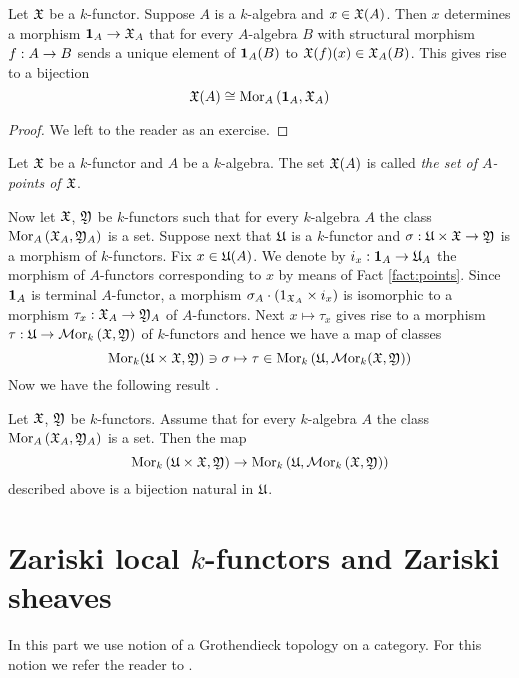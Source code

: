 \begin{fact}\label{fact:points}
Let ${\mathfrak X}$ be a $k$-functor. Suppose $A$ is a $k$-algebra and $x\in {\mathfrak X}(A)$. Then $x$ determines a morphism $\mathbf{1}_{A}\rightarrow {\mathfrak X}_A$ that for every $A$-algebra $B$ with structural morphism $f:A\rightarrow B$ sends a unique element of $\mathbf{1}_{A}(B)$ to ${\mathfrak X}(f)(x)\in {\mathfrak X}_A(B)$. This gives rise to a bijection
$${\mathfrak X}(A)\cong \mathrm{Mor}_{A}\left(\mathbf{1}_{A},{\mathfrak X}_A\right)$$
\end{fact}
\begin{proof}
We left to the reader as an exercise.
\end{proof}

\begin{definition}
Let ${\mathfrak X}$ be a $k$-functor and $A$ be a $k$-algebra. The set ${\mathfrak X}(A)$ is called \textit{the set of $A$-points of ${\mathfrak X}$}.
\end{definition}
\noindent
Now let ${\mathfrak X}$, ${\mathfrak Y}$ be $k$-functors such that for every $k$-algebra $A$ the class $\mathrm{Mor}_A\left({\mathfrak X}_A,{\mathfrak Y}_A\right)$ is a set. Suppose next that ${\mathfrak U}$ is a $k$-functor and $\sigma:{\mathfrak U}\times {\mathfrak X}\rightarrow {\mathfrak Y}$ is a morphism of $k$-functors. Fix $x\in {\mathfrak U}(A)$. We denote by $i_x:\mathbf{1}_A\rightarrow {\mathfrak U}_A$ the morphism of $A$-functors corresponding to $x$ by means of Fact \ref{fact:points}. Since $\mathbf{1}_A$ is terminal $A$-functor, a morphism $\sigma_A\cdot \left(1_{{\mathfrak X}_A}\times i_x\right)$ is isomorphic to a morphism $\tau_x:{\mathfrak X}_A\rightarrow {\mathfrak Y}_A$ of $A$-functors. Next $x\mapsto \tau_x$ gives rise to a morphism $\tau:{\mathfrak U}\rightarrow \mathcal{M}\mathrm{or}_k\left({\mathfrak X},{\mathfrak Y}\right)$ of $k$-functors and hence we have a map of classes
$$\mathrm{Mor}_k({\mathfrak U}\times {\mathfrak X},{\mathfrak Y})\ni \sigma\mapsto \tau\in \mathrm{Mor}_k\left({\mathfrak U},\mathcal{M}\mathrm{or}_k({\mathfrak X},{\mathfrak Y})\right)$$
Now we have the following result {\cite[Theorem 5.3]{Presheaves}}.

\begin{theorem}\label{theorem:homforkfunctors}
Let ${\mathfrak X}$, ${\mathfrak Y}$ be $k$-functors. Assume that for every $k$-algebra $A$ the class $\mathrm{Mor}_{A}\left({\mathfrak X}_A,{\mathfrak Y}_A\right)$ is a set. Then the map 
$$\mathrm{Mor}_{k}\left({\mathfrak U}\times {\mathfrak X},{\mathfrak Y}\right)\rightarrow  \mathrm{Mor}_{k}\left({\mathfrak U},\mathcal{M}\mathrm{or}_{k}\left({\mathfrak X},{\mathfrak Y}\right)\right)$$
described above is a bijection natural in ${\mathfrak U}$. 
\end{theorem}

\section{Zariski local $k$-functors and Zariski sheaves}
\noindent
In this part we use notion of a Grothendieck topology on a category. For this notion we refer the reader to \cite{Sheaves}.

